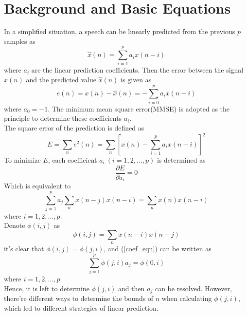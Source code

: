 \documentclass[preprint,12pt]{elsarticle}
\begin{document}
\section{Background and Basic Equations}
\label{S:1}
In a simplified situation, a speech can be linearly predicted from the previous $p$ samples as
\begin{equation}
	\hat{x}(n) =  \sum_{i=1}^{p} a_i x(n-i)
\end{equation}
where $a_i$ are the linear prediction coefficients. Then the error between the signal $x(n)$ and the predicted value $\hat{x}(n)$ is given as
\begin{equation}
	e(n) = x(n) - \hat{x}(n) = -\sum_{i=0}^{p}a_i x(n-i)
\end{equation}
where $a_0 = -1$. The minimum mean square error(MMSE) is adopted as the principle to determine these coefficients $a_i$.\\
The square error of the prediction is defined as
\begin{equation}
	E = \sum_{n}e^2(n) = \sum_{n}[x(n) - \sum_{i=1}^{p}a_i x(n-i)]^2
\end{equation}
To minimize $E$, each coefficient $a_i\ (i = 1, 2, ..., p)$ is determined as
\begin{equation}
	\frac{\partial E}{\partial a_i} = 0
\end{equation}
Which is equivalent to
\begin{equation}\label{coef_eqn}
	\sum_{j=1}^{p}a_j \sum_{n}x(n-j)x(n-i) = \sum_{n}x(n)x(n-i)
\end{equation}
where $i= 1, 2, ..., p$. \\
Denote $\phi(i,j)$ as
\begin{equation}\label{phi_def}
	\phi(i, j) = \sum_{n}x(n-i)x(n-j) 
\end{equation}
it's clear that $\phi(i,j) = \phi(j, i)$, and (\ref{coef_eqn}) can be written as
\begin{equation}
	\sum_{j=1}^{p} \phi(j, i)a_j = \phi(0, i)
\end{equation}
where $i= 1, 2, ..., p$.\\
Hence, it is left to determine $\phi(j, i)$ and then $a_j$ can be resolved. However, there're different ways to determine the bounds of $n$ when calculating $\phi(j, i)$, which led to different strategies of linear prediction.
\end{document}

